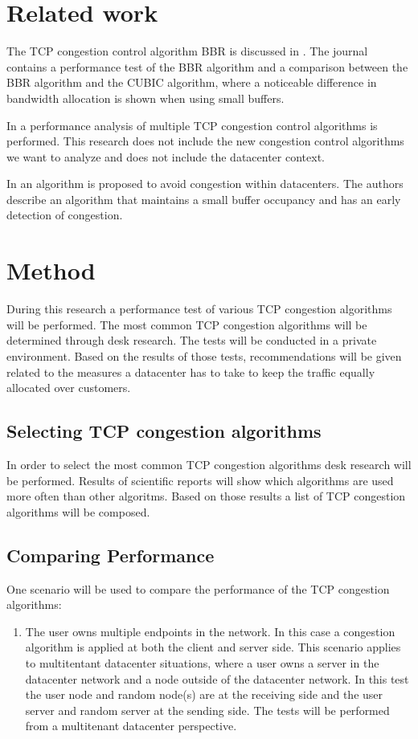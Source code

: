 \documentclass{article}
\begin{document}
\section{Related work}


The TCP congestion control algorithm BBR is discussed in \cite{bbr-congestion}.
The journal contains a performance test of the BBR algorithm and a comparison
between the BBR algorithm and the CUBIC algorithm, where a noticeable
difference in bandwidth allocation is shown when using small buffers.

In \cite{multiple-congestion} a performance analysis of multiple TCP congestion
control algorithms is performed. This research does not include the new
congestion control algorithms we want to analyze and does not include the
datacenter context.

In \cite{dctcp-congestion-original} an algorithm is proposed to avoid
congestion within datacenters. The authors describe an algorithm that maintains
a small buffer occupancy and has an early detection of congestion.

\section{Method}
During this research a performance test of various TCP congestion algorithms will be performed. The most common TCP congestion algorithms will be determined through desk research. The tests will be conducted in a private environment. Based on the results of those tests, recommendations will be given related to the measures a datacenter has to take to keep the traffic equally allocated over customers. 

	\subsection{Selecting TCP congestion algorithms}	
	In order to select the most common TCP congestion algorithms desk research will be performed. Results of scientific reports will show which algorithms are used more often than other algoritms. Based on those results a list of TCP congestion algorithms will be composed.	
	
	\subsection{Comparing Performance}
	One scenario will be used to compare the performance of the TCP congestion algorithms:
	\begin{enumerate}
		\item The user owns multiple endpoints in the network. In this case a congestion algorithm is applied at both the client and server side. This scenario applies to multitentant datacenter situations, where a user owns a server in the datacenter network and a node outside of the datacenter network. In this test the user node and random node(s) are at the receiving side and the user server and random server at the sending side. The tests will be performed from a multitenant datacenter perspective.
	\end{enumerate}
	
\end{document}
